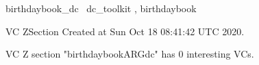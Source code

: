 \documentclass{article}
\begin{document}

\begin{zsection}	 \SECTION birthdaybook\_dc \parents~dc\_toolkit , birthdaybook
\end{zsection}

\newcommand{\appliesTo}{\zbinop{appliesTo}} 
\newcommand{\appliesToNofix}{\zpreop{appliesToNofix}} 

VC ZSection Created at Sun Oct 18 08:41:42 UTC 2020.



 VC Z section "birthdaybookARGdc" has $0$ interesting VCs.



\end{document}
